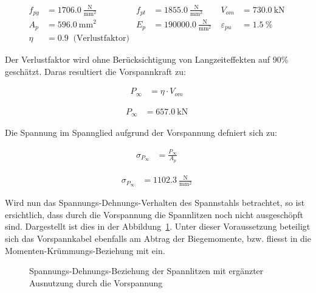 \documentclass[
  11pt,
  letterpaper,
]{scrreprt}
\begin{document}
$$
\begin{aligned}
f_{py} &= 1706.0\ \frac{\mathrm{N}}{\mathrm{mm}^{2}} \; 
 &f_{pt} &= 1855.0\ \frac{\mathrm{N}}{\mathrm{mm}^{2}} \; 
 &V_{om} &= 730.0\ \mathrm{kN} \; 
\\[10pt]
 A_{p} &= 596.0\ \mathrm{mm}^{2} \; 
 &E_{p} &= 190000.0\ \frac{\mathrm{N}}{\mathrm{mm}^{2}} \; 
 &\varepsilon_{pu} &= 1.5\ \mathrm{\%} \; 
\\[10pt]
 \eta &= 0.9 \; \;\textrm{(Verlustfaktor)}
\end{aligned}
$$

Der Verlustfaktor wird ohne Berücksichtigung von Langzeiteffekten auf
90\% geschätzt. Daras resultiert die Vorspannkraft zu:

$$
\begin{aligned}
P_{\infty} &= \eta \cdot V_{om} \; 
\end{aligned}
$$

$$
\begin{aligned}
P_{\infty} &= 657.0\ \mathrm{kN} \;
\end{aligned}
$$

Die Spannung im Spannglied aufgrund der Vorspannung defniert sich zu:

$$
\begin{aligned}
\sigma_{P_{\infty}} &= \frac{ P_{\infty} }{ A_{p} } \; 
\end{aligned}
$$

$$
\begin{aligned}
\sigma_{P_{\infty}} &= 1102.3\ \frac{\mathrm{N}}{\mathrm{mm}^{2}} \;
\end{aligned}
$$

Wird nun das Spannungs-Dehnungs-Verhalten des Spannstahls betrachtet, so
ist ersichtlich, dass durch die Vorspannung die Spannlitzen noch nicht
ausgeschöpft sind. Dargestellt ist dies in der
Abbildung~\ref{fig-ausnutzung_sigma_p}. Unter dieser Voraussetzung
beteiligt sich das Vorspannkabel ebenfalls am Abtrag der Biegemomente,
bzw. fliesst in die Momenten-Krümmungs-Beziehung mit ein.

\begin{figure}[H]


\caption{\label{fig-ausnutzung_sigma_p}Spannungs-Dehnungs-Beziehung der
Spannlitzen mit ergänzter Ausnutzung durch die Vorspannung}

\end{figure}%
\end{document}
